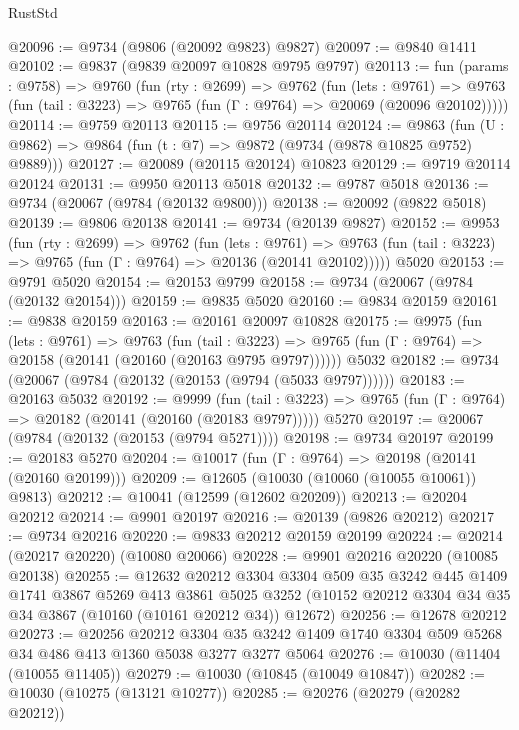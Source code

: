 \begin{lexlean}{RustStd}
\begin{coremodule}
@20096 := @9734 (@9806 (@20092 @9823) @9827)
@20097 := @9840 @1411
@20102 := @9837 (@9839 @20097 @10828 @9795 @9797)
@20113 := fun (params : @9758) =>
  @9760
    (fun (rty : @2699) =>
    @9762
      (fun (lets : @9761) =>
      @9763 (fun (tail : @3223) => @9765 (fun (Γ : @9764) => @20069 (@20096 @20102)))))
@20114 := @9759 @20113
@20115 := @9756 @20114
@20124 := @9863
    (fun (U : @9862) => @9864 (fun (t : @7) => @9872 (@9734 (@9878 @10825 @9752) @9889)))
@20127 := @20089 (@20115 @20124) @10823
@20129 := @9719 @20114 @20124
@20131 := @9950 @20113 @5018
@20132 := @9787 @5018
@20136 := @9734 (@20067 (@9784 (@20132 @9800)))
@20138 := @20092 (@9822 @5018)
@20139 := @9806 @20138
@20141 := @9734 (@20139 @9827)
@20152 := @9953
    (fun (rty : @2699) =>
    @9762
      (fun (lets : @9761) =>
      @9763 (fun (tail : @3223) => @9765 (fun (Γ : @9764) => @20136 (@20141 @20102)))))
    @5020
@20153 := @9791 @5020
@20154 := @20153 @9799
@20158 := @9734 (@20067 (@9784 (@20132 @20154)))
@20159 := @9835 @5020
@20160 := @9834 @20159
@20161 := @9838 @20159
@20163 := @20161 @20097 @10828
@20175 := @9975
    (fun (lets : @9761) =>
    @9763
      (fun (tail : @3223) =>
      @9765 (fun (Γ : @9764) => @20158 (@20141 (@20160 (@20163 @9795 @9797))))))
    @5032
@20182 := @9734 (@20067 (@9784 (@20132 (@20153 (@9794 (@5033 @9797))))))
@20183 := @20163 @5032
@20192 := @9999
    (fun (tail : @3223) => @9765 (fun (Γ : @9764) => @20182 (@20141 (@20160 (@20183 @9797)))))
    @5270
@20197 := @20067 (@9784 (@20132 (@20153 (@9794 @5271))))
@20198 := @9734 @20197
@20199 := @20183 @5270
@20204 := @10017 (fun (Γ : @9764) => @20198 (@20141 (@20160 @20199)))
@20209 := @12605 (@10030 (@10060 (@10055 @10061)) @9813)
@20212 := @10041 (@12599 (@12602 @20209))
@20213 := @20204 @20212
@20214 := @9901 @20197
@20216 := @20139 (@9826 @20212)
@20217 := @9734 @20216
@20220 := @9833 @20212 @20159 @20199
@20224 := @20214 (@20217 @20220) (@10080 @20066)
@20228 := @9901 @20216 @20220 (@10085 @20138)
@20255 := @12632
    @20212
    @3304
    @3304
    @509
    @35
    @3242
    @445
    @1409
    @1741
    @3867
    @5269
    @413
    @3861
    @5025
    @3252
    (@10152 @20212 @3304 @34 @35 @34 @3867 (@10160 (@10161 @20212 @34)) @12672)
@20256 := @12678 @20212
@20273 := @20256
    @20212
    @3304
    @35
    @3242
    @1409
    @1740
    @3304
    @509
    @5268
    @34
    @486
    @413
    @1360
    @5038
    @3277
    @3277
    @5064
@20276 := @10030 (@11404 (@10055 @11405))
@20279 := @10030 (@10845 (@10049 @10847))
@20282 := @10030 (@10275 (@13121 @10277))
@20285 := @20276 (@20279 (@20282 @20212))

\end{coremodule}
\end{lexlean}
